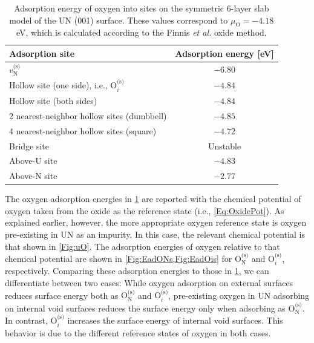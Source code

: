 \documentclass[preprint,12pt,sort&compress]{elsarticle}
\newcommand{\?}{\stackrel{?}{=}}
\begin{document}
\begin{table}[h!]
\centering
\caption{Adsorption energy of oxygen into sites on the symmetric 6-layer slab model of the UN (001) surface. These values correspond to $\mu_\text{O} = - 4.18$ eV, which is calculated according to the Finnis \textit{et al.} \cite{Finnis2005} oxide method.}
\footnotesize
\begin{tabular}{lc}
\hline
Adsorption site & Adsorption energy [eV] \\
\hline
$v_\text{N}^\text{(s)}$                      & $-6.80$ \\
Hollow site (one side), i.e., O$_i^\text{(s)}$ & $-4.84$ \\
Hollow site (both sides)                         & $-4.84$ \\
2 nearest-neighbor hollow sites (dumbbell)       & $-4.85$ \\
4 nearest-neighbor hollow sites (square)         & $-4.72$ \\
Bridge site                                      & Unstable \\ %
Above-U site                                     & $-4.83$ \\
Above-N site                                     & $-2.77$ \\
\hline
\end{tabular}
\label{Tab:Ead}
\end{table}

The oxygen adsorption energies in \cref{Tab:Ead} are reported with the chemical potential of oxygen taken from the oxide as the reference state (i.e., \cref{Eq:OxidePot}). As explained earlier, however, the more appropriate oxygen reference state is oxygen pre-existing in UN as an impurity. In this case, the relevant chemical potential is that shown in \cref{Fig:uO}. The adsorption energies of oxygen relative to that chemical potential are shown in \cref{Fig:EadONs,Fig:EadOis} for $\text{O}_\text{N}^\text{(s)}$ and $\text{O}_i^\text{(s)}$, respectively. Comparing these adsorption energies to those in \cref{Tab:Ead}, we can differentiate between two cases: While oxygen adsorption on external surfaces reduces surface energy both as $\text{O}_\text{N}^\text{(s)}$ and $\text{O}_i^\text{(s)}$, pre-existing oxygen in UN adsorbing on internal void surfaces reduces the surface energy only when adsorbing as $\text{O}_\text{N}^\text{(s)}$. In contrast, $\text{O}_i^\text{(s)}$ increases the surface energy of internal void surfaces. This behavior is due to the different reference states of oxygen in both cases. 
\end{document}
